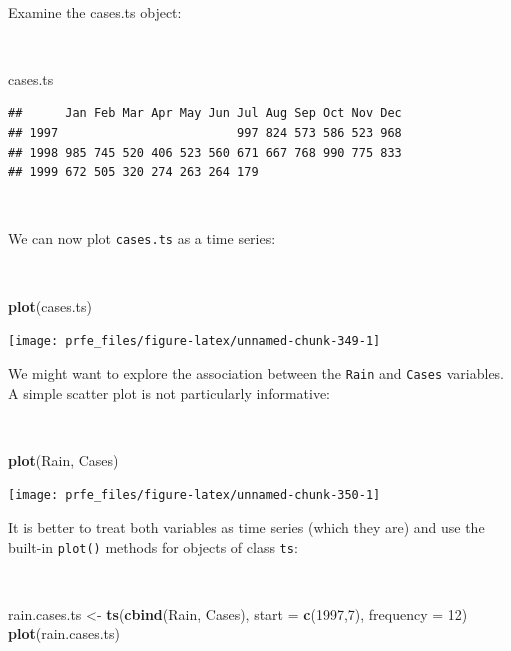 \documentclass[12pt,a4paper]{book}
\newenvironment{Shaded}{\begin{snugshade}}{\end{snugshade}}
\newcommand{\KeywordTok}[1]{\textcolor[rgb]{0.13,0.29,0.53}{\textbf{#1}}}
\newcommand{\DataTypeTok}[1]{\textcolor[rgb]{0.13,0.29,0.53}{#1}}
\newcommand{\DecValTok}[1]{\textcolor[rgb]{0.00,0.00,0.81}{#1}}
\newcommand{\StringTok}[1]{\textcolor[rgb]{0.31,0.60,0.02}{#1}}
\newcommand{\NormalTok}[1]{#1}
\theoremstyle{definition}
\theoremstyle{definition}
\theoremstyle{definition}
\theoremstyle{remark}
\begin{document}
~

Examine the cases.ts object:

~

\begin{Shaded}
\begin{Highlighting}[]
\NormalTok{cases.ts}
\end{Highlighting}
\end{Shaded}

\begin{verbatim}
##      Jan Feb Mar Apr May Jun Jul Aug Sep Oct Nov Dec
## 1997                         997 824 573 586 523 968
## 1998 985 745 520 406 523 560 671 667 768 990 775 833
## 1999 672 505 320 274 263 264 179
\end{verbatim}

~

We can now plot \texttt{cases.ts} as a time series:

~

\begin{Shaded}
\begin{Highlighting}[]
\KeywordTok{plot}\NormalTok{(cases.ts)}
\end{Highlighting}
\end{Shaded}

\begin{center}\texttt{[image: prfe\_files/figure-latex/unnamed-chunk-349-1]} \end{center}

\newpage

We might want to explore the association between the \texttt{Rain} and
\texttt{Cases} variables. A simple scatter plot is not particularly
informative:

~

\begin{Shaded}
\begin{Highlighting}[]
\KeywordTok{plot}\NormalTok{(Rain, Cases)}
\end{Highlighting}
\end{Shaded}

\begin{center}\texttt{[image: prfe\_files/figure-latex/unnamed-chunk-350-1]} \end{center}

\newpage

It is better to treat both variables as time series (which they are) and
use the built-in \texttt{plot()} methods for objects of class
\texttt{ts}:

~

\begin{Shaded}
\begin{Highlighting}[]
\NormalTok{rain.cases.ts <-}\StringTok{ }\KeywordTok{ts}\NormalTok{(}\KeywordTok{cbind}\NormalTok{(Rain, Cases), }\DataTypeTok{start =} \KeywordTok{c}\NormalTok{(}\DecValTok{1997}\NormalTok{,}\DecValTok{7}\NormalTok{), }\DataTypeTok{frequency =} \DecValTok{12}\NormalTok{)}
\KeywordTok{plot}\NormalTok{(rain.cases.ts)}
\end{Highlighting}
\end{Shaded}
\end{document}
